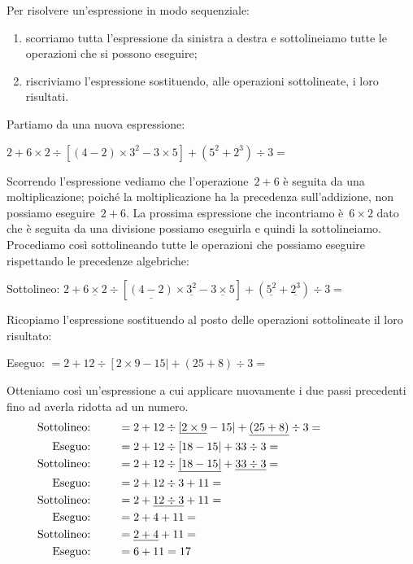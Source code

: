 \begin{procedura}{}{}
 Per risolvere un'espressione in modo sequenziale:
\begin{enumerate} [noitemsep] 
\item scorriamo tutta l'espressione da sinistra a destra 
e sottolineiamo tutte le operazioni che si possono eseguire;
\item riscriviamo l'espressione sostituendo, alle operazioni sottolineate,
i loro risultati.
\end{enumerate}
\end{procedura}

Partiamo da una nuova espressione:

\(2 + 6 \times 2 \div 
 \left[ \left(4 -2 \right) \times 3^{2} - 3 \times 5 \right] +
 \left( 5^{2} + 2^{3} \right) \div 3 =\)
 
Scorrendo l'espressione vediamo che l'operazione~\(2 + 6\) è seguita da una 
moltiplicazione; poiché la moltiplicazione ha la precedenza sull'addizione,
non possiamo eseguire~\(2 + 6\). La prossima espressione che incontriamo 
è~\(6 \times 2\) dato che è seguita da una divisione possiamo eseguirla e 
quindi la sottolineiamo. Procediamo così sottolineando tutte le operazioni
che possiamo eseguire rispettando le precedenze algebriche:

\noindent Sottolineo: \hspace{28mm} \(2 + 
 \underline{6 \times 2} \div \left[ \underline{\left(4 -2 \right)} 
   \times \underline{3^{2}} - 
   \underline{3 \times 5} \right] +
 \left( \underline{5^{2}} + \underline{2^{3}} \right) \div 3 =\)

Ricopiamo l'espressione sostituendo al posto delle operazioni 
sottolineate il loro risultato:

\noindent Eseguo: \hspace{28.7mm} \(= 2 + 
 12 \div \left[ 2 \times 9 - 15 \right| +
 \left( 25 + 8 \right) \div 3 =\)

Otteniamo così un'espressione a cui applicare nuovamente i due passi 
precedenti fino ad averla ridotta ad un numero.
\begin{align*}
\text{Sottolineo: } \qquad &= 2 + 
 12 \div \left[ \underline{2 \times 9} - 15 \right| +
 \underline{\left( 25 + 8 \right)} \div 3 = \hspace{20mm}\\ 
\text{Eseguo: } \qquad &= 2 + 12 \div \left[ 18 - 15 \right| +
 33 \div 3 =\\ 
\text{Sottolineo: } \qquad &= 2 + 
 12 \div \underline{\left[ 18 - 15 \right|} +
 \underline{33 \div 3} = \\ 
\text{Eseguo: } \qquad &= 2 + 
 12 \div 3 +
 11 = \\ 
\text{Sottolineo: } \qquad &= 2 + 
 \underline{12 \div 3} +
 11 = \\ 
\text{Eseguo: } \qquad &= 2 + 
 4 +
 11 = \\ 
\text{Sottolineo: } \qquad &= \underline{2 +  4} + 11 = \\ 
\text{Eseguo: } \qquad &= 6 + 11 = 17
\end{align*}

